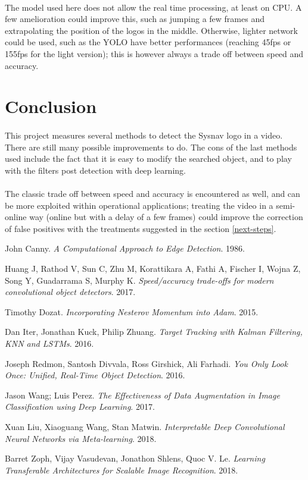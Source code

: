 \documentclass[12pt]{article}%
\begin{document}
\paragraph{}
The model used here does not allow the real time processing, at least on CPU. A few amelioration could improve this, such as jumping a few frames and extrapolating the position of the logos in the middle. Otherwise, lighter network could be used, such as the YOLO \cite{yolo} have better performances (reaching 45fps or 155fps for the light version); this is however always a trade off between speed and accuracy.

\section{Conclusion}
\paragraph{}
This project measures several methods to detect the Sysnav logo in a video. There are still many possible improvements to do. The cons of the last methods used include the fact that it is easy to modify the searched object, and to play with the filters post detection with deep learning.

\paragraph{}
The classic trade off between speed and accuracy is encountered as well, and can be more exploited within operational applications; treating the video in a semi-online way (online but with a delay of a few frames) could improve the correction of false positives with the treatments suggested in the section \ref{next-steps}.


\begin{thebibliography}{9}
John Canny. 
\textit{A Computational Approach to Edge Detection}. 
1986.

Huang J, Rathod V, Sun C, Zhu M, Korattikara A, Fathi A, Fischer I, Wojna Z,
Song Y, Guadarrama S, Murphy K.
\textit{Speed/accuracy trade-offs for modern convolutional object detectors}.
2017.

Timothy Dozat.
\textit{Incorporating Nesterov Momentum into Adam}.
2015.
 
Dan Iter, Jonathan Kuck, Philip Zhuang.
\textit{Target Tracking with Kalman Filtering, KNN and LSTMs}.
2016.

Joseph Redmon, Santosh Divvala, Ross Girshick, Ali Farhadi.
\textit{You Only Look Once: Unified, Real-Time Object Detection}.
2016.
 
Jason Wang; Luis Perez.
\textit{The Effectiveness of Data Augmentation in Image Classification using Deep Learning}.
2017.
 
Xuan Liu, Xiaoguang Wang, Stan Matwin.
\textit{Interpretable Deep Convolutional Neural Networks via Meta-learning}.
2018.

Barret Zoph, Vijay Vasudevan, Jonathon Shlens, Quoc V. Le.
\textit{Learning Transferable Architectures for Scalable Image Recognition}.
2018.
\end{thebibliography}
\end{document}

